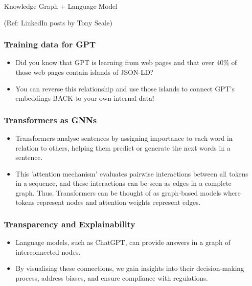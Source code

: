 \begin{frame}[fragile]\frametitle{}
\begin{center}
{\Large Knowledge Graph + Language Model}

{\tiny (Ref: LinkedIn posts by Tony Seale)}

\end{center}
\end{frame}

\begin{frame}[fragile]\frametitle{Training data for GPT}

\begin{itemize}
\item Did you know that GPT is learning from web pages and that over 40\% of those web pages contain islands of JSON-LD?
\item You can reverse this relationship and use those islands to connect GPT's embeddings BACK to your own internal data!
\end{itemize}
	  
\end{frame}

\begin{frame}[fragile]\frametitle{Transformers as GNNs}

\begin{itemize}
\item Transformers analyse sentences by assigning importance to each word in relation to others, helping them predict or generate the next words in a sentence. 
\item This 'attention mechanism' evaluates pairwise interactions between all tokens in a sequence, and these interactions can be seen as edges in a complete graph. Thus, Transformers can be thought of as graph-based models where tokens represent nodes and attention weights represent edges.
\end{itemize}
	  
\end{frame}


\begin{frame}[fragile]\frametitle{Transparency and Explainability}

\begin{itemize}
\item  Language models, such as ChatGPT, can provide answers in a graph of interconnected nodes. 
\item By visualising these connections, we gain insights into their decision-making process, address biases, and ensure compliance with regulations.
\end{itemize}
	  
\end{frame}

